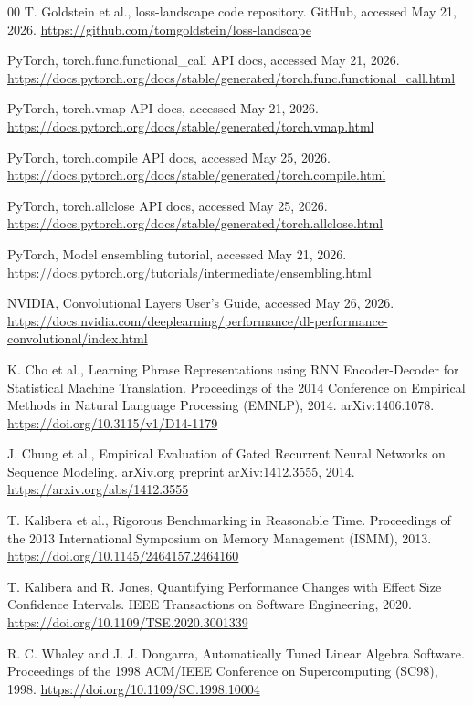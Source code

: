 \documentclass[conference]{IEEEtran}
\begin{document}
\begin{thebibliography}{00}
T. Goldstein et al., loss-landscape code repository. GitHub,
accessed May 21, 2026.
\url{https://github.com/tomgoldstein/loss-landscape}

PyTorch, torch.func.functional\_call API docs, accessed May 21, 2026.
\url{https://docs.pytorch.org/docs/stable/generated/torch.func.functional_call.html}

PyTorch, torch.vmap API docs, accessed May 21, 2026.
\url{https://docs.pytorch.org/docs/stable/generated/torch.vmap.html}

PyTorch, torch.compile API docs, accessed May 25, 2026.
\url{https://docs.pytorch.org/docs/stable/generated/torch.compile.html}

PyTorch, torch.allclose API docs, accessed May 25, 2026.
\url{https://docs.pytorch.org/docs/stable/generated/torch.allclose.html}

PyTorch, Model ensembling tutorial, accessed May 21, 2026.
\url{https://docs.pytorch.org/tutorials/intermediate/ensembling.html}

NVIDIA, Convolutional Layers User's Guide, accessed May 26, 2026.
\url{https://docs.nvidia.com/deeplearning/performance/dl-performance-convolutional/index.html}

K. Cho et al., Learning Phrase Representations using RNN
Encoder-Decoder for Statistical Machine Translation. Proceedings of
the 2014 Conference on Empirical Methods in Natural Language Processing
(EMNLP), 2014. arXiv:1406.1078.
\url{https://doi.org/10.3115/v1/D14-1179}

J. Chung et al., Empirical Evaluation of Gated Recurrent Neural
Networks on Sequence Modeling.
arXiv.org preprint arXiv:1412.3555, 2014.
\url{https://arxiv.org/abs/1412.3555}

T. Kalibera et al., Rigorous Benchmarking in Reasonable Time.
Proceedings of the 2013 International Symposium on Memory
Management (ISMM), 2013.
\url{https://doi.org/10.1145/2464157.2464160}

T. Kalibera and R. Jones, Quantifying Performance Changes with
Effect Size Confidence Intervals. IEEE Transactions on Software
Engineering, 2020.
\url{https://doi.org/10.1109/TSE.2020.3001339}

R. C. Whaley and J. J. Dongarra, Automatically Tuned Linear
Algebra Software. Proceedings of the 1998 ACM/IEEE Conference
on Supercomputing (SC98), 1998.
\url{https://doi.org/10.1109/SC.1998.10004}


\end{thebibliography}
\end{document}
